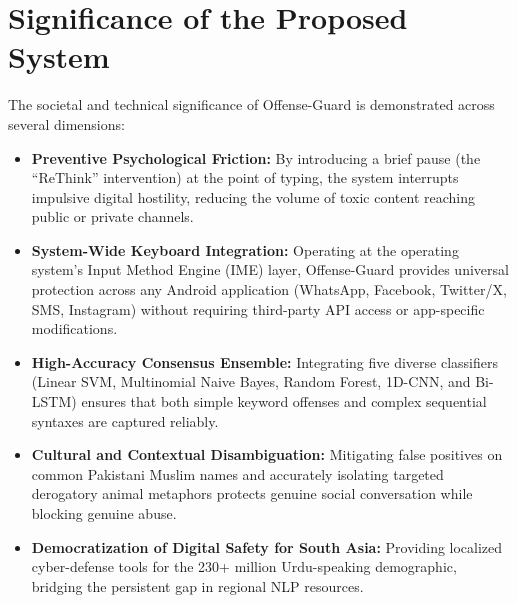 \documentclass[A4paper,12pt]{report}
\theoremstyle{plain}
\theoremstyle{definition}
\theoremstyle{remark}
\numberwithin{equation}{section}
\begin{document}
\section{Significance of the Proposed System}
The societal and technical significance of Offense-Guard is demonstrated across several dimensions:
\begin{itemize}[leftmargin=*]
    \item \textbf{Preventive Psychological Friction:} By introducing a brief pause (the ``ReThink'' intervention) at the point of typing, the system interrupts impulsive digital hostility, reducing the volume of toxic content reaching public or private channels.
    \item \textbf{System-Wide Keyboard Integration:} Operating at the operating system's Input Method Engine (IME) layer, Offense-Guard provides universal protection across any Android application (WhatsApp, Facebook, Twitter/X, SMS, Instagram) without requiring third-party API access or app-specific modifications.
    \item \textbf{High-Accuracy Consensus Ensemble:} Integrating five diverse classifiers (Linear SVM, Multinomial Naive Bayes, Random Forest, 1D-CNN, and Bi-LSTM) ensures that both simple keyword offenses and complex sequential syntaxes are captured reliably.
    \item \textbf{Cultural and Contextual Disambiguation:} Mitigating false positives on common Pakistani Muslim names and accurately isolating targeted derogatory animal metaphors protects genuine social conversation while blocking genuine abuse.
    \item \textbf{Democratization of Digital Safety for South Asia:} Providing localized cyber-defense tools for the 230+ million Urdu-speaking demographic, bridging the persistent gap in regional NLP resources.
\end{itemize}
\end{document}
